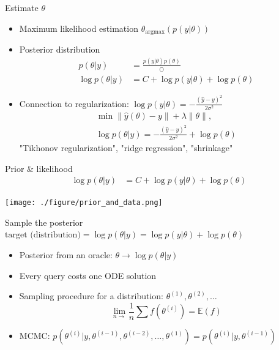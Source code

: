 \documentclass[bigger]{beamer}
\begin{document}
\begin{frame}[label={sec:orgde436b1}]{Estimate \(\theta\)}
\begin{itemize}
\item <1->  Maximum likelihood estimation
\(\theta_{\text{argmax}}(p(y|\theta))\)
\item <2-> Posterior distribution
\begin{align*}
  p(\theta | y) &= \frac{p(y|\theta)p(\theta)}{\bigcirc}\\
  \log{p(\theta|y)} &= C + \log{p(y | \theta)} + \log{p(\theta)}
\end{align*}
\item <3-> Connection to regularization: \(\log{p(y | \theta)}= -\frac{(\hat{y}-y)^2}{2\sigma^2}\)
\begin{align*}
  \min{\|\hat{y}(\theta)-y\| + \lambda\|\theta\|},\\
  \log p(\theta|y)=-\frac{(\hat{y}-y)^2}{2\sigma^2} + \log p(\theta)
\end{align*}
"Tikhonov regularization", "ridge regression", "shrinkage"
\end{itemize}
\end{frame}

\begin{frame}[label={sec:orgd0da4be}]{Prior \& likelihood}
\begin{align*}
  \log{p(\theta|y)} &= C + \log{p(y | \theta)} + \log{p(\theta)}
\end{align*}
\begin{center}
\texttt{[image: ./figure/prior\_and\_data.png]}
\end{center}
\end{frame}


\begin{frame}[label={sec:org4c77049}]{Sample the posterior}
\(\text{target (distribution)} = \log{p(\theta|y)} = \log{p(y | \theta)} + \log{p(\theta)}\)

\begin{itemize}
\item <1-> Posterior from an oracle: \(\theta \rightarrow \log{p(\theta | y)}\)
\item <2-> Every query costs one ODE solution
\item <3-> Sampling procedure for a distribution: \(\theta^{(1)}, \theta^{(2)}, \dots\)
\begin{equation*}
  \lim_{n\rightarrow }\frac{1}{n}\sum{f(\theta^{(i)})}=\mathbb{E}(f)
\end{equation*}
\item <4-> MCMC: \(p(\theta^{(i)} | y, \theta^{(i-1)},  \theta^{(i-2)}, \dots, \theta^{(1)})=p(\theta^{(i)} | y, \theta^{(i-1)})\)
\end{itemize}
\end{frame}
\end{document}
